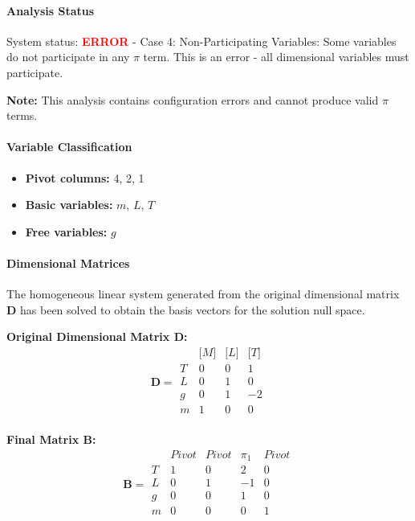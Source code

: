 \paragraph{Analysis Status}
System status: \textcolor{red}{\textbf{ERROR}} - Case 4: Non-Participating Variables: Some variables do not participate in any $\pi$ term. This is an error - all dimensional variables must participate.

\textbf{Note:} This analysis contains configuration errors and cannot produce valid $\pi$ terms.


\paragraph{Variable Classification}
\begin{itemize}
\item \textbf{Pivot columns:} 4, 2, 1
\item \textbf{Basic variables:} $m$, $L$, $T$
\item \textbf{Free variables:} $g$
\end{itemize}

                \paragraph{Dimensional Matrices}
                The homogeneous linear system generated from the original dimensional matrix $\mathbf{D}$ has been solved to obtain the basis vectors for the solution null space.

                \textbf{Original Dimensional Matrix $\mathbf{D}$:}
                \[\mathbf{D} = \begin{array}{r|rrr}
                & \text{[}M\text{]} & \text{[}L\text{]} & \text{[}T\text{]} \\
                \hline
                T & 0 & 0 & 1 \\
L & 0 & 1 & 0 \\
g & 0 & 1 & -2 \\
m & 1 & 0 & 0 \\

                \end{array}\]


        \textbf{Final Matrix $\mathbf{B}$:}
        \[\mathbf{B} = \begin{array}{r|rrrr}
        & Pivot & Pivot & \pi_{1} & Pivot \\
        \hline
        T & 1 & 0 & 2 & 0 \\
L & 0 & 1 & -1 & 0 \\
g & 0 & 0 & 1 & 0 \\
m & 0 & 0 & 0 & 1 \\

        \end{array}\]

